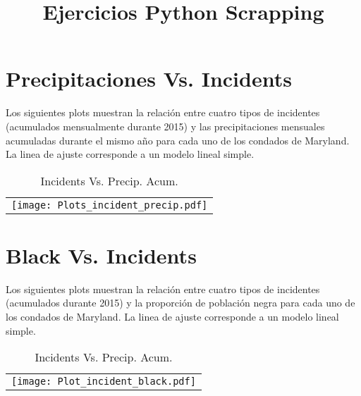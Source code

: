 \documentclass[11pt,spanish]{article}
\title{Ejercicios Python Scrapping}
\date{\vspace{-5ex}}
\begin{document}
\maketitle


\newpage
\section{Precipitaciones Vs. Incidents}
Los siguientes plots muestran la relación entre cuatro tipos de incidentes (acumulados mensualmente durante 2015) y las precipitaciones mensuales acumuladas durante el mismo año para cada uno de los condados de Maryland. La linea de ajuste corresponde a un modelo lineal simple.
\begin{table}[H]
 \centering
 \caption{Incidents Vs. Precip. Acum.}
\begin{tabular}{c}
\texttt{[image: Plots\_incident\_precip.pdf]}
\end{tabular}
\end{table}

\newpage
\section{Black Vs. Incidents}

Los siguientes plots muestran la relación entre cuatro tipos de incidentes (acumulados durante 2015) y la proporción de población negra para cada uno de los condados de Maryland. La linea de ajuste corresponde a un modelo lineal simple.
\begin{table}[H]
 \centering
 \caption{Incidents Vs. Precip. Acum.}
\begin{tabular}{c}
\texttt{[image: Plot\_incident\_black.pdf]}
\end{tabular}
\end{table}
\end{document}
